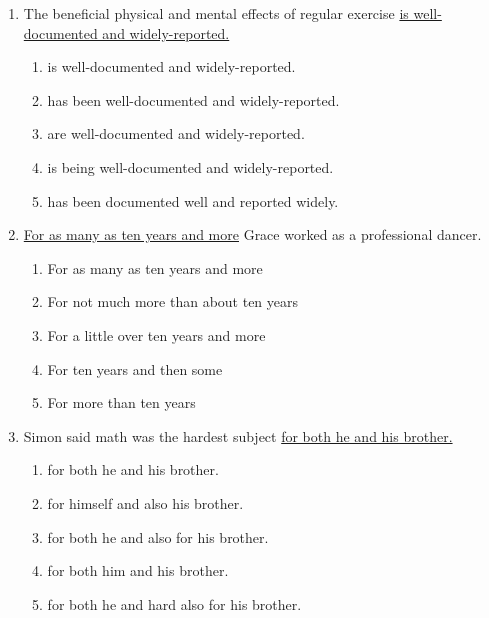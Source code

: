 \begin{enumerate}
\bigskip
\item The beneficial physical and mental effects of regular exercise \ul{is well-documented and widely-reported.} 
\begin{enumerate}[label=(\Alph*)]
\item is well-documented and widely-reported.
\item has been well-documented and widely-reported.
\item are well-documented and widely-reported.
\item is being well-documented and widely-reported.
\item has been documented well and reported widely.
\end{enumerate}

\bigskip
\item \underline{For as many as ten years and more} Grace worked as a professional dancer.
\begin{enumerate}[label=(\Alph*)]
\item For as many as ten years and more
\item For not much more than about ten years 
\item For a little over ten years and more
\item For ten years and then some
\item For more than ten years
\end{enumerate}

\bigskip
\item Simon said math was the hardest subject \underline{for both he and his brother.}
\begin{enumerate}[label=(\Alph*)]
\item for both he and his brother.
\item for himself and also his brother.
\item for both he and also for his brother.
\item for both him and his brother.
\item for both he and hard also for his brother.
\end{enumerate}
\end{enumerate}
